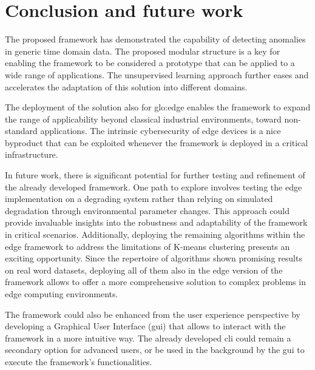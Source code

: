\chapter{Conclusion and future work}
\label{ch:Conclusion}

The proposed framework has demonstrated the capability of detecting anomalies in generic time domain data. The proposed modular structure is a key for enabling the framework to be considered a prototype that can be applied to a wide range of applications. The unsupervised learning approach further eases and accelerates the adaptation of this solution into different domains. 

The deployment of the solution also for \gls{glo:edge} enables the framework to expand the range of applicability beyond classical industrial environments, toward non-standard applications. The intrinsic cybersecurity of edge devices is a nice byproduct that can be exploited whenever the framework is deployed in a critical infrastructure.

In future work, there is significant potential for further testing and refinement of the already developed framework. One path to explore involves testing the edge implementation on a degrading system rather than relying on simulated degradation through environmental parameter changes. This approach could provide invaluable insights into the robustness and adaptability of the framework in critical scenarios. Additionally, deploying the remaining algorithms within the edge framework to address the limitations of K-means clustering presents an exciting opportunity. Since the repertoire of algorithms shown promising results on real word datasets, deploying all of them also in the edge version of the framework allows to offer a more comprehensive solution to complex problems in edge computing environments.

The framework could also be enhanced from the user experience perspective by developing a Graphical User Interface (\gls{gui}) that allows to interact with the framework in a more intuitive way. The already developed \gls{cli} could remain a secondary option for advanced users, or be used in the background by the \gls{gui} to execute the framework's functionalities. 